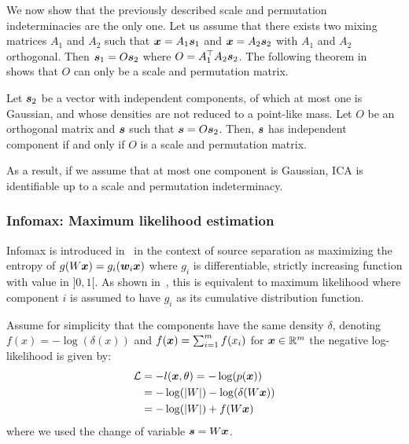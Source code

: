 We now show that the previously described scale and permutation
indeterminacies are the only one.
Let us assume that there exists two mixing matrices $A_1$ and $A_2$ such that
$\boldsymbol{x} = A_1 \boldsymbol{s}_1$ and $\boldsymbol{x} = A_2 \boldsymbol{s}_2$ with $A_1$ and $A_2$ orthogonal. Then $\boldsymbol{s}_1 = O \boldsymbol{s}_2$ where $O = A_1^{\top} A_2 \boldsymbol{s}_2$.
The following theorem in~\cite{comon1994independent}
shows that $O$ can only be a scale and permutation matrix.
\begin{theorem}
  Let $\boldsymbol{s}_2$  be a  vector  with  independent 
  components, of   which  at  most  one  is  Gaussian,  and whose  densities
  are  not  reduced  to  a  point-like  mass. Let $O$ be an orthogonal matrix
  and $\boldsymbol{s}$ such that $\boldsymbol{s} = O \boldsymbol{s}_2$.
  Then, $\boldsymbol{s}$ has independent component if and only if $O$ is a scale and
  permutation matrix.
\end{theorem}

As a result, if we assume that at most one component is Gaussian, ICA is identifiable up to a scale and permutation indeterminacy.

\subsubsection{Infomax: Maximum likelihood estimation}
Infomax is introduced in~\cite{bell1995information} in the context of source
separation as maximizing the entropy of $g(W \boldsymbol{x}) = g_i(\boldsymbol{w}_i \boldsymbol{x})$ where  $g_i$
is differentiable, strictly increasing function with value in $]0, 1[$. As shown
in~\cite{cois1997infomax}, this is equivalent to
maximum likelihood where component $i$ is assumed to have $g_i$ as its
cumulative distribution function.

Assume for simplicity that the components have the same density $\delta$, denoting $f(x) =
-\log(\delta(x))$ and $f(\boldsymbol{x}) = \sum_{i=1}^m f(x_i)$ for $\boldsymbol{x} \in
\mathbb{R}^m$ the negative log-likelihood is given by:
\begin{align}
  \mathcal{L} &= -l(\boldsymbol{x}, \theta) = - \log(p(\boldsymbol{x})) \\
        &= -\log(|W|) - \log(\delta(W \boldsymbol{x})) \\
  &= -\log(|W|) + f(W \boldsymbol{x})
\end{align}
where we used the change of variable $\boldsymbol{s} = W \boldsymbol{x}$.

